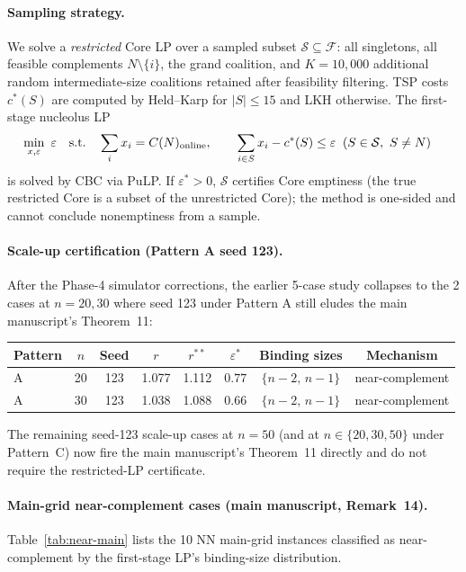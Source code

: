 \documentclass[11pt]{article}
\begin{document}
\paragraph{Sampling strategy.} We solve a \emph{restricted} Core LP over a sampled subset $\mathcal{S}\subseteq\mathcal{F}$: all singletons, all feasible complements $N\setminus\{i\}$, the grand coalition, and $K=10{,}000$ additional random intermediate-size coalitions retained after feasibility filtering. TSP costs $c^{\ast}(S)$ are computed by Held--Karp for $|S|\le 15$ and LKH \citep{helsgaun2000effective} otherwise. The first-stage nucleolus LP
\begin{align}
  \min_{x,\varepsilon}\ \varepsilon\quad\text{s.t.}\quad
  & \sum_i x_i = C(N)_{\text{online}},\qquad
    \sum_{i\in S} x_i - c^{\ast}(S)\le \varepsilon\;\;(S\in\mathcal{S},\ S\ne N) \notag
\end{align}
is solved by CBC via PuLP. If $\varepsilon^{\ast}>0$, $\mathcal{S}$ certifies Core emptiness (the true restricted Core is a subset of the unrestricted Core); the method is one-sided and cannot conclude nonemptiness from a sample.

\paragraph{Scale-up certification (Pattern A seed 123).} After the Phase-4 simulator corrections, the earlier 5-case study collapses to the 2 cases at $n=20, 30$ where seed 123 under Pattern A still eludes the main manuscript's Theorem~11:
\begin{center}
\footnotesize
\begin{tabular}{@{}lccccccc@{}}
\toprule
Pattern & $n$ & Seed & $r$ & $r^{\ast\ast}$ & $\varepsilon^{\ast}$ & Binding sizes & Mechanism \\
\midrule
A & 20 & 123 & 1.077 & 1.112 & $0.77$ & $\{n-2,\,n-1\}$ & near-complement \\
A & 30 & 123 & 1.038 & 1.088 & $0.66$ & $\{n-2,\,n-1\}$ & near-complement \\
\bottomrule
\end{tabular}
\end{center}
The remaining seed-123 scale-up cases at $n=50$ (and at $n\in\{20,30,50\}$ under Pattern~C) now fire the main manuscript's Theorem~11 directly and do not require the restricted-LP certificate.

\paragraph{Main-grid near-complement cases (main manuscript, Remark~14).} Table~\ref{tab:near-main} lists the 10 NN main-grid instances classified as near-complement by the first-stage LP's binding-size distribution.
\end{document}
